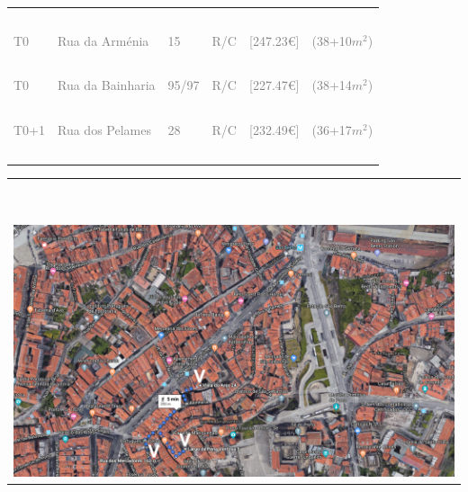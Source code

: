 \documentclass[]{report}
\begin{document}
\begin{table}[]
	\begin{center}
	\begin{huge}
	\begin{tabular}{llllll}
		&&&&&~\\
		\textcolor{gray}{T0}&
		\textcolor{gray}{Rua da Arm\'{e}nia}&
		\textcolor{gray}{15}&
		\textcolor{gray}{R/C}&
		\textcolor{gray}{[247.23€]} &
		\textcolor{gray}{(38+10$m^{2}$)} \\
		&&&&&~\\
		\textcolor{gray}{T0}&
		\textcolor{gray}{Rua da Bainharia}&
		\textcolor{gray}{\normalsize95/97}&
		\textcolor{gray}{R/C}&
		\textcolor{gray}{[227.47€]} &
		\textcolor{gray}{(38+14$m^{2}$)} \\
		&&&&&~\\
		\textcolor{gray}{T0+1}&
		\textcolor{gray}{Rua dos Pelames}&
		\textcolor{gray}{28}&
		\textcolor{gray}{R/C}&
		\textcolor{gray}{[232.49€]}&
		\textcolor{gray}{(36+17$m^{2}$)}\\
		&&&&&~\\
	\end{tabular}
	\end{huge}
	\end{center}
\end{table}


\begin{table}[]
	\begin{tabular}{c}
		~\\
		~\\
		\includegraphics[width=1\textwidth]{t1} \\
	\end{tabular}
\end{table}
\end{document}
